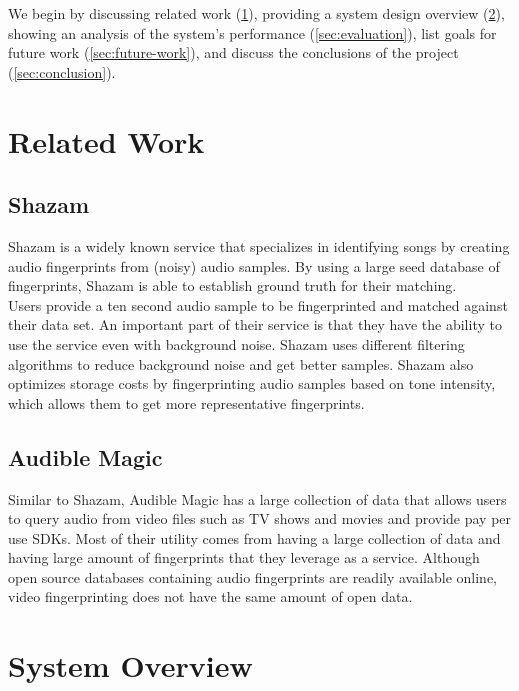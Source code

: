 \documentclass[paper=a4, fontsize=11pt]{scrartcl} %
\numberwithin{equation}{section} %
\numberwithin{figure}{section} %
\numberwithin{table}{section} %
\begin{document}
We begin by discussing related work (\ref{sec:related-work}), providing a system design overview (\ref{sec:system-overview}), showing an analysis of the system's performance (\ref{sec:evaluation}), list goals for future work (\ref{sec:future-work}), and discuss the conclusions of the project (\ref{sec:conclusion}).

\section{Related Work}
\label{sec:related-work}

\subsection{Shazam}
\label{sec:shazam}

Shazam is a widely known service that specializes in identifying songs by creating audio fingerprints from (noisy) audio samples. By using a large seed database of fingerprints, Shazam is able to establish ground truth for their matching. \\

Users provide a ten second audio sample to be fingerprinted and matched against their data set. An important part of their service is that they have the ability to use the service even with background noise. Shazam uses different filtering algorithms to reduce background noise and get better samples. Shazam also optimizes storage costs by fingerprinting audio samples based on tone intensity, which allows them to get more representative fingerprints. \\

\subsection{Audible Magic}
\label{sec:audible-magic}

Similar to Shazam, Audible Magic has a large collection of data that allows users to query audio from video files such as TV shows and movies and provide pay per use SDKs. Most of their utility comes from having a large collection of data and having large amount of fingerprints that they leverage as a service. Although open source databases containing audio fingerprints are readily available online, video fingerprinting does not have the same amount of open data. \\

\section{System Overview}
\label{sec:system-overview}
\end{document}

